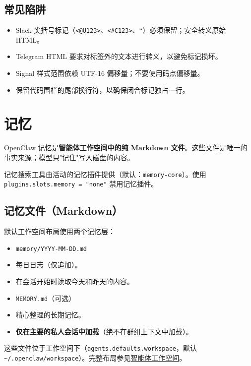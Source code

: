 \subsection{常见陷阱}


\begin{itemize}
  \item Slack 尖括号标记（\texttt{<@U123>}、\texttt{<\#C123>}、``）必须保留；安全转义原始 HTML。
  \item Telegram HTML 要求对标签外的文本进行转义，以避免标记损坏。
  \item Signal 样式范围依赖 UTF-16 偏移量；不要使用码点偏移量。
  \item 保留代码围栏的尾部换行符，以确保闭合标记独占一行。
\end{itemize}



\clearpage

\section{记忆}


OpenClaw 记忆是\textbf{智能体工作空间中的纯 Markdown 文件}。这些文件是唯一的事实来源；模型只"记住"写入磁盘的内容。

记忆搜索工具由活动的记忆插件提供（默认：\texttt{memory-core}）。使用 \texttt{plugins.slots.memory = "none"} 禁用记忆插件。

\subsection{记忆文件（Markdown）}


默认工作空间布局使用两个记忆层：

\begin{itemize}
  \item \texttt{memory/YYYY-MM-DD.md}
  \item 每日日志（仅追加）。
  \item 在会话开始时读取今天和昨天的内容。
  \item \texttt{MEMORY.md}（可选）
  \item 精心整理的长期记忆。
  \item \textbf{仅在主要的私人会话中加载}（绝不在群组上下文中加载）。
\end{itemize}


这些文件位于工作空间下（\texttt{agents.defaults.workspace}，默认 \texttt{\textasciitilde{}/.openclaw/workspace}）。完整布局参见\href{/concepts/agent-workspace}{智能体工作空间}。

